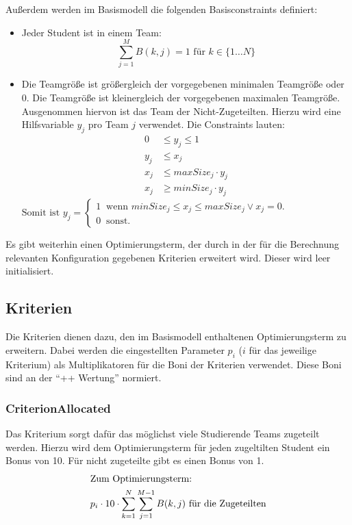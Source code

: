 \documentclass[parskip=full]{scrartcl}
\begin{document}
Außerdem werden im Basismodell die folgenden Basisconstraints definiert:



 \begin{itemize}
   \item Jeder Student ist in einem Team: \begin{equation*}
   \sum_{j = 1}^{M} B(k,j) = 1 \text{ für } k \in \{ 1\ldots N \}
   \end{equation*}
   \item Die Teamgröße ist größergleich der vorgegebenen minimalen Teamgröße
   oder 0. Die Teamgröße ist kleinergleich der vorgegebenen maximalen Teamgröße.
   Ausgenommen hiervon ist das Team der Nicht-Zugeteilten. Hierzu wird eine
   Hilfsvariable $y_j$ pro Team $j$ verwendet. Die Constraints lauten:
   \begin{align*}
    0 &\le  y_j \le 1\\
     y_j &\le x_j\\ 
    x_j &\le maxSize_j \cdot y_j \\ 
    x_j &\ge minSize_j \cdot y_j 
    \end{align*}
    $\text{Somit ist } y_j = \begin{cases}
    1 \;\; \text{wenn $minSize_j \le x_j \le maxSize_j \vee x_j = 0$.} \\
    0 \;\; \text{sonst.} 
    \end{cases}$
 \end{itemize}
 
 Es gibt weiterhin einen Optimierungsterm, der durch in der für die Berechnung
 relevanten Konfiguration gegebenen Kriterien erweitert wird. Dieser wird leer
 initialisiert.


\subsection{Kriterien}
Die Kriterien dienen dazu, den im Basismodell enthaltenen Optimierungsterm zu
erweitern. Dabei werden die eingestellten Parameter $p_i$ ($i$ für das
jeweilige Kriterium) als Multiplikatoren für die Boni der Kriterien verwendet.
Diese Boni sind an der \enquote{++ Wertung} normiert. 

\subsubsection{CriterionAllocated}
Das Kriterium sorgt dafür das möglichst viele Studierende Teams zugeteilt
werden. Hierzu wird dem Optimierungsterm für jeden zugeltilten Student ein Bonus
von 10. Für nicht zugeteilte gibt es einen Bonus von 1. \begin{align*}
\intertext{Zum Optimierungsterm:}
p_i \cdot 10 \cdot \sum_{k = 1}^{N} \sum_{j = 1}^{M-1} B(k,j) \text{ für die
Zugeteilten}
\end{align*}
\end{document}
